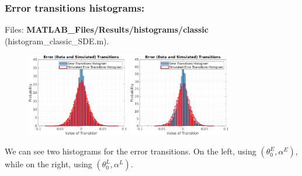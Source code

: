 \documentclass[aspectratio=169]{beamer}\usepackage[utf8]{inputenc}
\begin{document}
\begin{frame}\frametitle{Error transitions histograms:}
Files: \textbf{MATLAB\_Files/Results/histograms/classic} (histogram\_classic\_SDE.m).\\
\begin{figure}[ht!]
\centering
\includegraphics[width=0.4\textwidth]{../../MATLAB_Files/Results/histograms/classic/Optimal.eps}
\includegraphics[width=0.4\textwidth]{../../MATLAB_Files/Results/histograms/classic/Lamperti_Optimal.eps}
\end{figure}

We can see two histograms for the error transitions. On the left, using $(\theta_0^E,\alpha^E)$, while on the right, using $(\theta_0^L,\alpha^L)$.

\end{frame}

\end{document}
